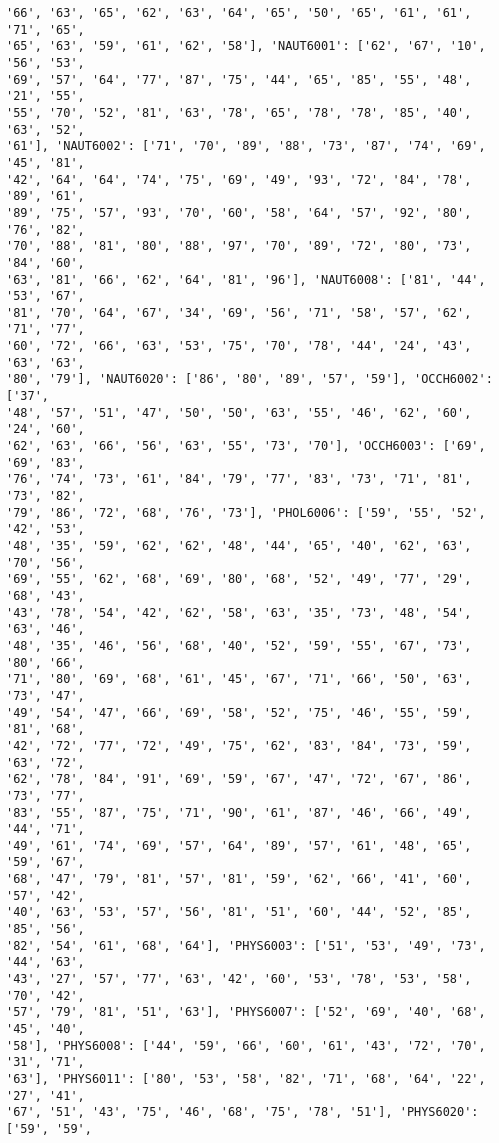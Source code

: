 \documentclass[11pt]{article}
\begin{document}
\begin{Verbatim}[commandchars=\\\{\}]
'66', '63', '65', '62', '63', '64', '65', '50', '65', '61', '61', '71', '65',
'65', '63', '59', '61', '62', '58'], 'NAUT6001': ['62', '67', '10', '56', '53',
'69', '57', '64', '77', '87', '75', '44', '65', '85', '55', '48', '21', '55',
'55', '70', '52', '81', '63', '78', '65', '78', '78', '85', '40', '63', '52',
'61'], 'NAUT6002': ['71', '70', '89', '88', '73', '87', '74', '69', '45', '81',
'42', '64', '64', '74', '75', '69', '49', '93', '72', '84', '78', '89', '61',
'89', '75', '57', '93', '70', '60', '58', '64', '57', '92', '80', '76', '82',
'70', '88', '81', '80', '88', '97', '70', '89', '72', '80', '73', '84', '60',
'63', '81', '66', '62', '64', '81', '96'], 'NAUT6008': ['81', '44', '53', '67',
'81', '70', '64', '67', '34', '69', '56', '71', '58', '57', '62', '71', '77',
'60', '72', '66', '63', '53', '75', '70', '78', '44', '24', '43', '63', '63',
'80', '79'], 'NAUT6020': ['86', '80', '89', '57', '59'], 'OCCH6002': ['37',
'48', '57', '51', '47', '50', '50', '63', '55', '46', '62', '60', '24', '60',
'62', '63', '66', '56', '63', '55', '73', '70'], 'OCCH6003': ['69', '69', '83',
'76', '74', '73', '61', '84', '79', '77', '83', '73', '71', '81', '73', '82',
'79', '86', '72', '68', '76', '73'], 'PHOL6006': ['59', '55', '52', '42', '53',
'48', '35', '59', '62', '62', '48', '44', '65', '40', '62', '63', '70', '56',
'69', '55', '62', '68', '69', '80', '68', '52', '49', '77', '29', '68', '43',
'43', '78', '54', '42', '62', '58', '63', '35', '73', '48', '54', '63', '46',
'48', '35', '46', '56', '68', '40', '52', '59', '55', '67', '73', '80', '66',
'71', '80', '69', '68', '61', '45', '67', '71', '66', '50', '63', '73', '47',
'49', '54', '47', '66', '69', '58', '52', '75', '46', '55', '59', '81', '68',
'42', '72', '77', '72', '49', '75', '62', '83', '84', '73', '59', '63', '72',
'62', '78', '84', '91', '69', '59', '67', '47', '72', '67', '86', '73', '77',
'83', '55', '87', '75', '71', '90', '61', '87', '46', '66', '49', '44', '71',
'49', '61', '74', '69', '57', '64', '89', '57', '61', '48', '65', '59', '67',
'68', '47', '79', '81', '57', '81', '59', '62', '66', '41', '60', '57', '42',
'40', '63', '53', '57', '56', '81', '51', '60', '44', '52', '85', '85', '56',
'82', '54', '61', '68', '64'], 'PHYS6003': ['51', '53', '49', '73', '44', '63',
'43', '27', '57', '77', '63', '42', '60', '53', '78', '53', '58', '70', '42',
'57', '79', '81', '51', '63'], 'PHYS6007': ['52', '69', '40', '68', '45', '40',
'58'], 'PHYS6008': ['44', '59', '66', '60', '61', '43', '72', '70', '31', '71',
'63'], 'PHYS6011': ['80', '53', '58', '82', '71', '68', '64', '22', '27', '41',
'67', '51', '43', '75', '46', '68', '75', '78', '51'], 'PHYS6020': ['59', '59',

\end{Verbatim}
\end{document}
